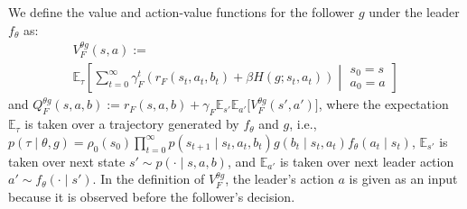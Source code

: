 \documentclass[letterpaper]{article} %
\providecommand{\E}{\mathbb{E}} %
\begin{document}
We define the value and action-value functions for the follower $g$ under the leader $f_{\theta}$ as:
\begin{multline*}
        V_F^{{\theta} {g}}(s, a):=\\ \E_\tau\left[\sum_{t=0}^\infty\gamma_F^t \left(r_F(s_t,a_t,b_t) + \beta H(g;s_t, a_t)\right)\middle|\begin{array}{l}s_0=s\\a_0=a\end{array}\right]
\end{multline*}%
and $Q_F^{{\theta} {g}}(s, a, b) := r_F(s, a, b) + \gamma_F\E_{s'}\E_{a'}\big[ V_F^{\theta {g}}(s', a') \big]$, where the expectation $\E_\tau$ is taken over a trajectory generated by $f_{\theta}$ and $g$, i.e., $p(\tau\mid \theta, g) = \rho_0(s_0) \prod_{t=0}^{\infty} p(s_{t+1} \mid s_{t}, a_{t}, b_{t}) g(b_{t}\mid s_{t}, a_{t}) f_{{\theta}}(a_{t}\mid s_{t})$, $\E_{s'}$ is taken over next state $s' \sim p(\cdot \mid s, a, b)$, and $\E_{a'}$ is taken over next leader action $a' \sim f_\theta(\cdot \mid s')$.
In the definition of $V_F^{\theta g}$, the leader's action $a$ is given as an input because it is observed before the follower's decision.
\end{document}
